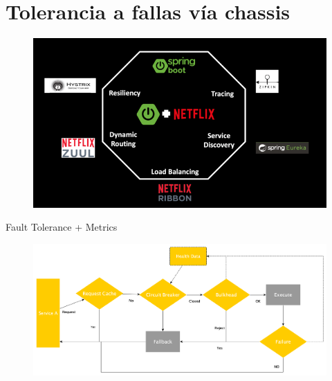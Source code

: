 \documentclass[aspectratio=169]{beamer}
\begin{document}
{
    \section{Tolerancia a fallas vía chassis}
}


\begin{frame}{}
    \begin{figure}
        \centering
        \includegraphics[width=\linewidth]{Images/netflix.png}
    \end{figure}

\end{frame}




\begin{frame}{Fault Tolerance + Metrics}


\begin{figure}
	\centering
	\includegraphics[width=0.9\linewidth]{Images/falldata}
\end{figure}

\end{frame}
\end{document}
